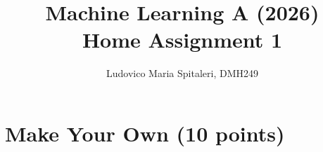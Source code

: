 \documentclass[a4paper,12pt]{article}
\begin{document}
\title{Machine Learning A (2026)\\Home Assignment 1}
\author{\color{red}Ludovico Maria Spitaleri, DMH249}
\date{}
\maketitle

\tableofcontents %
\newpage %

\section{Make Your Own (10 points)}

\end{document}
